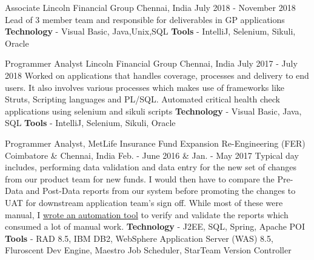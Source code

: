 

\begin{cventries}

  \cventry
    {Associate} %
    {Lincoln Financial Group} %
    {Chennai, India} %
    {July 2018 - November 2018} %
    {
        Lead of 3 member team and responsible for deliverables in GP applications
        \newline
        \textbf{Technology} - Visual Basic, Java,Unix,SQL \newline
        \textbf{Tools} - IntelliJ, Selenium, Sikuli, Oracle
    }

  \cventry
    {Programmer Analyst} %
    {Lincoln Financial Group} %
    {Chennai, India} %
    {July 2017 - July 2018} %
    {
        Worked on applications that handles coverage, processes and delivery to end users. It also involves various processes which makes use of frameworks like Struts, Scripting languages and PL/SQL.
        \newline
        Automated critical health check applications using selenium and sikuli scripts\newline
        \textbf{Technology} - Visual Basic, Java, SQL \newline
        \textbf{Tools} - IntelliJ, Selenium, Sikuli, Oracle
    }

  \cventry
    {Programmer Analyst, MetLife Insurance} %
    {Fund Expansion Re-Engineering (FER)} %
    {Coimbatore \& Chennai, India} %
    {Feb. - June 2016 \& Jan. - May 2017} %
    {
        Typical day includes, performing data validation and data entry for the new set of changes from our product team for new funds. I would then have to compare the Pre-Data and Post-Data reports from our system before promoting the changes to UAT for downstream application team's sign off. While most of these were manual, I \underline{wrote an automation tool} to verify and validate the reports which consumed a lot of manual work.
        \newline
        \textbf{Technology} - J2EE, SQL, Spring, Apache POI \newline
        \textbf{Tools} - RAD 8.5, IBM DB2, WebSphere Application Server (WAS) 8.5, Fluroscent Dev Engine, Maestro Job Scheduler, StarTeam Version Controller
    }


\end{cventries}
